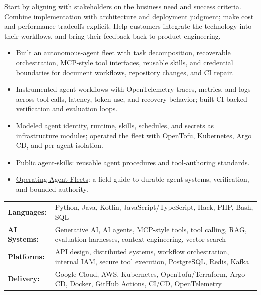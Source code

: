 Start by aligning with stakeholders on the business need and success criteria. Combine implementation with architecture and deployment judgment; make cost and performance tradeoffs explicit. Help customers integrate the technology into their workflows, and bring their feedback back to product engineering.

\begin{itemize}
  \item Built an autonomous-agent fleet with task decomposition, recoverable orchestration, MCP-style tool interfaces, reusable skills, and credential boundaries for document workflows, repository changes, and CI repair.
  \item Instrumented agent workflows with OpenTelemetry traces, metrics, and logs across tool calls, latency, token use, and recovery behavior; built CI-backed verification and evaluation loops.
  \item Modeled agent identity, runtime, skills, schedules, and secrets as infrastructure modules; operated the fleet with OpenTofu, Kubernetes, Argo CD, and per-agent isolation.
\end{itemize}

\begin{itemize}
  \item \href{https://github.com/selamy-labs/agent-skills}{Public agent-skills}: reusable agent procedures and tool-authoring standards.
  \item \href{https://github.com/pselamy/operating-agent-fleets}{Operating Agent Fleets}: a field guide to durable agent systems, verification, and bounded authority.
\end{itemize}

{\renewcommand{\arraystretch}{1.15}%
\begin{tabularx}{\linewidth}{@{}>{\bfseries}l X@{}}
Languages: & Python, Java, Kotlin, JavaScript/TypeScript, Hack, PHP, Bash, SQL \\
AI Systems: & Generative AI, AI agents, MCP-style tools, tool calling, RAG, evaluation harnesses, context engineering, vector search \\
Platforms: & API design, distributed systems, workflow orchestration, internal IAM, secure tool execution, PostgreSQL, Redis, Kafka \\
Delivery: & Google Cloud, AWS, Kubernetes, OpenTofu/Terraform, Argo CD, Docker, GitHub Actions, CI/CD, OpenTelemetry \\
\end{tabularx}}

